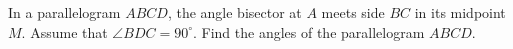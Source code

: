 \problem
In a parallelogram $ABCD$, the angle bisector at $A$ meets side $BC$ in its
midpoint $M$.
Assume that $\angle BDC = 90^\circ$.
Find the angles of the parallelogram $ABCD$.
\solution
\endproblem
